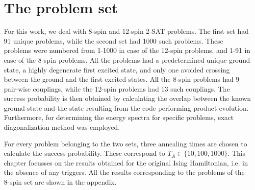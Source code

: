 \documentclass[../main.tex]{subfiles}
\begin{document}
\section{The problem set}
For this work, we deal with 8-spin and 12-spin 2-SAT problems. The first set had 91 unique problems, while the second set had 1000 such problems. These problems were numbered from 1-1000 in case of the 12-spin problems, and 1-91 in case of the 8-spin problems. All the problems had a predetermined unique ground state, a highly degenerate first excited state, and only one avoided crossing between the ground and the first excited states. All the 8-spin problems had 9 pair-wise couplings, while the 12-spin problems had 13 such couplings. The success probability is then obtained by calculating the overlap between the known ground state and the state resulting from the code performing product evolution. Furthermore, for determining the energy spectra for specific problems, exact diagonalization method was employed.

For every problem belonging to the two sets, three annealing times are chosen to calculate the success probability. These correspond to $T_A \in \{ 10,100,1000 \}$. This chapter focusses on the results obtained for the original Ising Hamiltonian, i.e. in the absence of any triggers. All the results corresponding to the problems of the 8-spin set are shown in the appendix.
\end{document}
